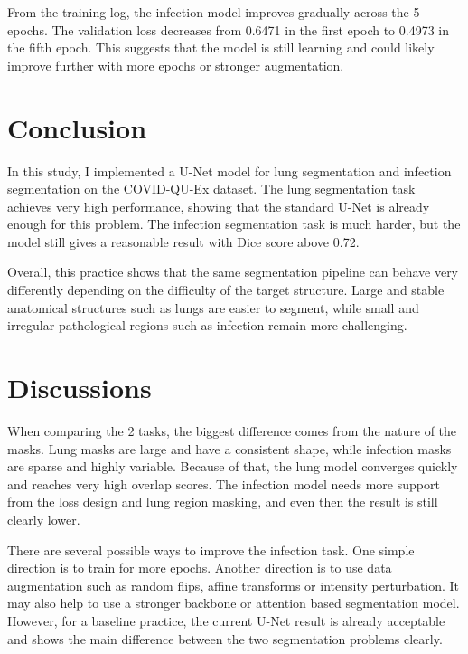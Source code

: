 \documentclass[conference]{IEEEtran}
\begin{document}
From the training log, the infection model improves gradually across the 5 epochs. The validation loss decreases from 0.6471 in the first epoch to 0.4973 in the fifth epoch. This suggests that the model is still learning and could likely improve further with more epochs or stronger augmentation.

\section{Conclusion}

In this study, I implemented a U-Net model for lung segmentation and infection segmentation on the COVID-QU-Ex dataset. The lung segmentation task achieves very high performance, showing that the standard U-Net is already enough for this problem. The infection segmentation task is much harder, but the model still gives a reasonable result with Dice score above 0.72.

Overall, this practice shows that the same segmentation pipeline can behave very differently depending on the difficulty of the target structure. Large and stable anatomical structures such as lungs are easier to segment, while small and irregular pathological regions such as infection remain more challenging.

\section{Discussions}

When comparing the 2 tasks, the biggest difference comes from the nature of the masks. Lung masks are large and have a consistent shape, while infection masks are sparse and highly variable. Because of that, the lung model converges quickly and reaches very high overlap scores. The infection model needs more support from the loss design and lung region masking, and even then the result is still clearly lower.

There are several possible ways to improve the infection task. One simple direction is to train for more epochs. Another direction is to use data augmentation such as random flips, affine transforms or intensity perturbation. It may also help to use a stronger backbone or attention based segmentation model. However, for a baseline practice, the current U-Net result is already acceptable and shows the main difference between the two segmentation problems clearly.



\end{document}
